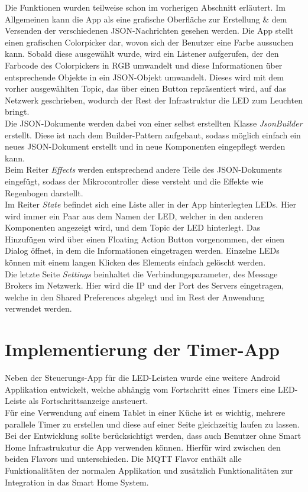 Die Funktionen wurden teilweise schon im vorherigen Abschnitt erläutert. Im Allgemeinen kann die App als eine grafische Oberfläche zur Erstellung \& dem Versenden der verschiedenen JSON-Nachrichten gesehen werden. Die App stellt einen grafischen Colorpicker dar, wovon sich der Benutzer eine Farbe aussuchen kann. Sobald diese ausgewählt wurde, wird ein Listener aufgerufen, der den Farbcode des Colorpickers in RGB umwandelt und diese Informationen über entsprechende Objekte in ein JSON-Objekt umwandelt. Dieses wird mit dem vorher ausgewählten Topic, das über einen Button repräsentiert wird, auf das Netzwerk geschrieben, wodurch der Rest der Infrastruktur die LED zum Leuchten bringt. \\
Die JSON-Dokumente werden dabei von einer selbst erstellten Klasse \textit{JsonBuilder} erstellt. Diese ist nach dem Builder-Pattern aufgebaut, sodass möglich einfach ein neues JSON-Dokument erstellt und in neue Komponenten eingepflegt werden kann.\\
Beim Reiter \textit{Effects} werden entsprechend andere Teile des JSON-Dokuments eingefügt, sodass der Mikrocontroller diese versteht und die Effekte wie Regenbogen darstellt. \\
Im Reiter \textit{State} befindet sich eine Liste aller in der App hinterlegten LEDs. Hier wird immer ein Paar aus dem Namen der LED, welcher in den anderen Komponenten angezeigt wird, und dem Topic der LED hinterlegt. Das Hinzufügen wird über einen Floating Action Button vorgenommen, der einen Dialog öffnet, in dem die Informationen eingetragen werden. Einzelne LEDs können mit einem langen Klicken des Elements einfach gelöscht werden. \\
Die letzte Seite \textit{Settings} beinhaltet die Verbindungsparameter, des Message Brokers im Netzwerk. Hier wird die IP und der Port des Servers eingetragen, welche in den Shared Preferences abgelegt und im Rest der Anwendung verwendet werden.


\section{Implementierung der Timer-App} \label{impl_timer_app}
Neben der Steuerungs-App für die LED-Leisten wurde eine weitere Android Applikation entwickelt, welche abhängig vom Fortschritt eines Timers eine LED-Leiste als Fortschrittsanzeige ansteuert.\\
Für eine Verwendung auf einem Tablet in einer Küche ist es wichtig, mehrere parallele Timer zu erstellen und diese auf einer Seite gleichzeitig laufen zu lassen. Bei der Entwicklung sollte berücksichtigt werden, dass auch Benutzer ohne Smart Home Infrastrukutur die App verwenden können. Hierfür wird zwischen den beiden Flavors  und  unterschieden. Die MQTT Flavor enthält alle Funktionalitäten der normalen Applikation und zusätzlich Funktionalitäten zur Integration in das Smart Home System.

